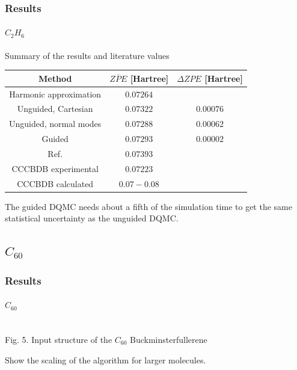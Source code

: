 \documentclass[16pt]{beamer}
\begin{document}
\begin{frame}
\frametitle{Results}
\framesubtitle{$C_2 H_6$}
Summary of the results and literature values
\begin{table}[h]
\centering
 \begin{tabular}{||c | c | c||} 
 \hline
 Method & $\overline{ZPE}$ [Hartree] & $\Delta ZPE$ [Hartree] \\ [0.5ex] 
 \hline\hline
 Harmonic approximation & $0.07264$ & \\
 \hline
 Unguided, Cartesian & $0.07322$ &  $0.00076$\\
  \hline
 Unguided, normal modes & $0.07288$ &  $0.00062$\\
 \hline
 Guided & $0.07293$ & $0.00002$ \\
 \hline
 Ref. \cite{c2h6} & $0.07393$ &\\
 \hline
 CCCBDB experimental & $0.07223$ & \\
 \hline
 CCCBDB calculated & $0.07 - 0.08$ & \\
 \hline
\end{tabular}
\end{table}
The guided DQMC needs about a fifth of the simulation time to get the same statistical uncertainty as the unguided DQMC. 
\end{frame}

\subsection{$C_{60}$}

\begin{frame}
\frametitle{Results}
\framesubtitle{$C_{60}$}
\begin{center}
\\
Fig. 5. Input structure of the $C_{60}$ Buckminsterfullerene
\end{center}
Show the scaling of the algorithm for larger molecules.
\end{frame}
\end{document}
